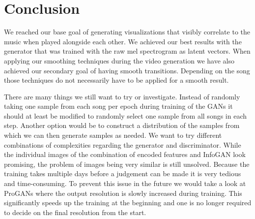 \chapter{Conclusion}

    We reached our base goal of generating visualizations that visibly correlate to the music when played alongside each other. We achieved our best results with the generator that was trained with the raw mel spectrogram as latent vectors. When applying our smoothing techniques during the video generation we have also achieved our secondary goal of having smooth transitions. Depending on the song those techniques do not necessarily have to be applied for a smooth result.

    There are many things we still want to try or investigate. Instead of randomly taking one sample from each song per epoch during training of the GANs it should at least be modified to randomly select one sample from all songs in each step. Another option would be to construct a distribution of the samples from which we can then generate samples as needed. We want to try different combinations of complexities regarding the generator and discriminator. While the individual images of the combination of encoded features and InfoGAN look promising, the problem of images being very similar is still unsolved. Because the training takes multiple days before a judgement can be made it is very tedious and time-consuming. To prevent this issue in the future we would take a look at ProGANs where the output resolution is slowly increased during training. This significantly speeds up the training at the beginning and one is no longer required to decide on the final resolution from the start.
